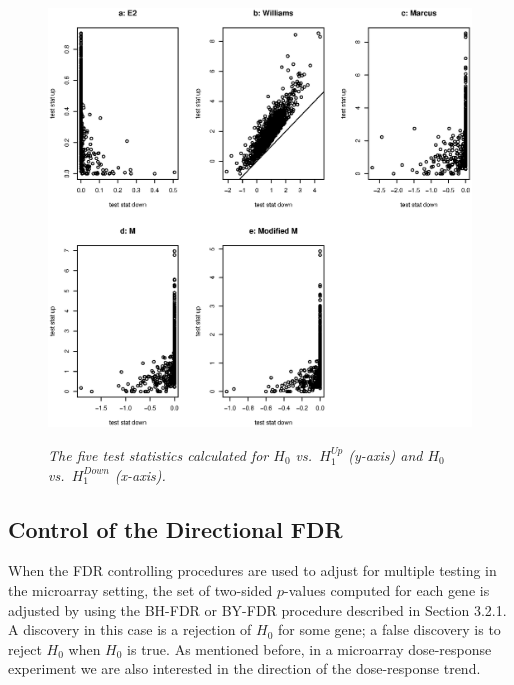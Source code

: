 \documentclass[10pt]{mybook4}
\begin{document}
\begin{figure}[!h]
\centering
{\includegraphics[width=.9\textwidth]{stat1a.eps}}
\caption{\em{The five test statistics calculated for $H_0$ vs.\
$H_1^{Up}$ (y-axis) and $H_0$ vs.\ $H_1^{Down}$ (x-axis).}}
\label{stat1}
\end{figure}








\subsection{Control of the Directional FDR}
\label{sec: FDR}

When the FDR controlling procedures are used to adjust for multiple
testing in the microarray setting, the set of two-sided $p$-values
computed for each gene is adjusted by using the BH-FDR or BY-FDR
procedure described in Section 3.2.1. A discovery in this case is a
rejection of $H_0$ for some gene; a false discovery is to reject
$H_0$ when $H_0$ is true. As mentioned before, in a microarray
dose-response experiment we are also interested in the direction of
the dose-response trend.
\end{document}
